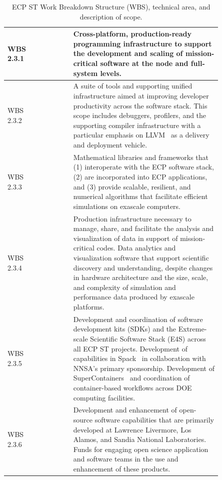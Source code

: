 \begin{table}
	\begin{tabular}{|>{\columncolor[gray]{0.8}}p{0.10\linewidth}|>{\columncolor[rgb]{0.88,1,1}}p{0.15\linewidth}|p{0.6\linewidth}|}\hline
	    \vfill WBS 2.3.1\vfill & \vfill \centering{Programming Models and Runtimes} \vfill & \vfill Cross-platform, production-ready programming infrastructure to support the development and scaling of mission-critical software at the node and full-system levels.\vfill \\\hline
		\vfill WBS 2.3.2 \vfill & \vfill \centering{Development Tools} \vfill & \vfill A suite of tools and supporting unified infrastructure aimed at improving developer productivity across the software stack. This scope includes debuggers, profilers, and the supporting compiler infrastructure with a particular emphasis on LLVM~\cite{LLVM:2018} as a delivery and deployment vehicle. \vfill \\\hline
		\vfill WBS 2.3.3 \vfill & \vfill \centering{Mathematical Libraries} \vfill & \vfill Mathematical libraries and frameworks that (1) interoperate with the ECP software stack, (2) are incorporated into ECP applications, and (3) provide scalable, resilient, and numerical algorithms that facilitate efficient simulations on exascale computers.\vfill \\\hline
		\vfill WBS 2.3.4 \vfill & \vfill \centering{Data and Visualization} \vfill & \vfill Production infrastructure necessary to manage, share, and facilitate the analysis and visualization of data in support of mission-critical codes. Data analytics and visualization software that support scientific discovery and understanding, despite changes in hardware architecture and the size, scale, and complexity of simulation and performance data produced by exascale platforms. \vfill \\\hline
		\vfill WBS 2.3.5 \vfill & \vfill \centering{Software Ecosystem and Delivery} \vfill & \vfill Development and coordination of software development kits (SDKs) and the Extreme-scale Scientific Software Stack (E4S) across all ECP ST projects.  Development of capabilities in Spack~\cite{gamblin+:sc15} in collaboration with NNSA's primary sponsorship.  Development of SuperContainers~\cite{Supercontainers} and coordination of container-based workflows across DOE computing facilities.\vfill \\\hline
		\vfill WBS 2.3.6 \vfill & \vfill \centering{NNSA ST} \vfill & \vfill Development and enhancement of open-source software capabilities that are primarily developed at Lawrence Livermore, Los Alamos, and Sandia National Laboratories.  Funds for engaging open science application and software teams in the use and enhancement of these products.\vfill \\\hline
	\end{tabular}
	\caption{\label{table:wbs} ECP ST Work Breakdown Structure (WBS), technical area, and description of scope.}
\end{table}

